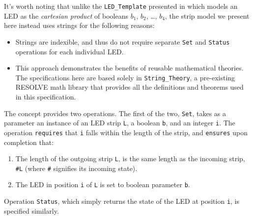 \documentclass{sig-alternate}
\begin{document}
It's worth noting that unlike the \texttt{LED\_Template} presented in \cite{regula:2010} which models an LED as the \textit{cartesian product} of booleans $b_1$, $b_2$, \ldots , $b_4$, the strip model we present here instead uses strings for the following reasons:
\begin{itemize}
\item Strings are indexible, and thus do not require separate \texttt{Set} and \texttt{Status} operations for each individual LED.
\item This approach demonstrates the benefits of reusable mathematical theories. The specifications here are based solely in \texttt{String\_Theory}, a pre-existing RESOLVE math library that provides all the definitions and theorems used in this specification.
\end{itemize}

The concept provides two operations. The first of the two, \texttt{Set}, takes as a parameter an instance of an LED strip \texttt{L}, a boolean \texttt{b}, and an integer \texttt{i}. The operation \texttt{requires} that \texttt{i} falls within the length of the strip, and \texttt{ensures} upon completion that:
\begin{enumerate}
\item The length of the outgoing strip \texttt{L}, is the same length as the incoming strip, \texttt{\#L} (where \texttt{\#} signifies its incoming state).
\item The LED in position \texttt{i} of \texttt{L} is set to boolean parameter \texttt{b}. 
\end{enumerate}
Operation \texttt{Status}, which simply returns the state of the LED at position \texttt{i}, is specified similarly. 

\end{document}

